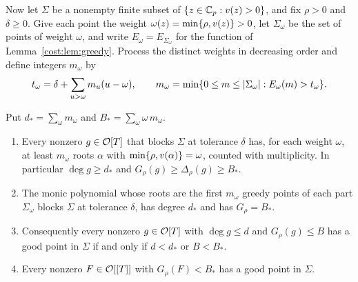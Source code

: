 Now let $\Sigma$ be a nonempty finite subset of $\{z\in\mathbb{C}_p:v(z)>0\}$, and fix $\rho>0$ and
$\delta\ge0$. Give each point the weight $\omega(z)=\min\{\rho,v(z)\}>0$, let
$\Sigma_\omega$ be the set of points of weight $\omega$, and write
$E_\omega=E_{\Sigma_\omega}$ for the function of Lemma~\ref{cost:lem:greedy}. Process the
distinct weights in decreasing order and define integers $m_\omega$ by
\begin{equation}\label{cost:eq:rec}
 t_\omega=\delta+\sum_{u>\omega}m_u(u-\omega),\qquad
 m_\omega=\min\{0\le m\le\lvert\Sigma_\omega\rvert:E_\omega(m)>t_\omega\}.
\end{equation}

\begin{theorem}\label{cost:thm:finite}
Put $d_*=\sum_\omega m_\omega$ and $B_*=\sum_\omega\omega\,m_\omega$.
\begin{enumerate}[label=\textup{(\alph*)}]
\item Every nonzero $g\in\mathcal{O}[T]$ that blocks $\Sigma$ at tolerance $\delta$ has, for each
weight $\omega$, at least $m_\omega$ roots $\alpha$ with $\min\{\rho,v(\alpha)\}=\omega$,
counted with multiplicity. In particular $\deg g\ge d_*$ and
$G_\rho(g)\ge\Delta_\rho(g)\ge B_*$.
\item The monic polynomial whose roots are the first $m_\omega$ greedy points of each part
$\Sigma_\omega$ blocks $\Sigma$ at tolerance $\delta$, has degree $d_*$ and has
$G_\rho=B_*$.
\item Consequently every nonzero $g\in\mathcal{O}[T]$ with $\deg g\le d$ and $G_\rho(g)\le B$ has a
good point in $\Sigma$ if and only if $d<d_*$ or $B<B_*$.
\item Every nonzero $F\in\mathcal{O}[[T]]$ with $G_\rho(F)<B_*$ has a good point in $\Sigma$.
\end{enumerate}
\end{theorem}

